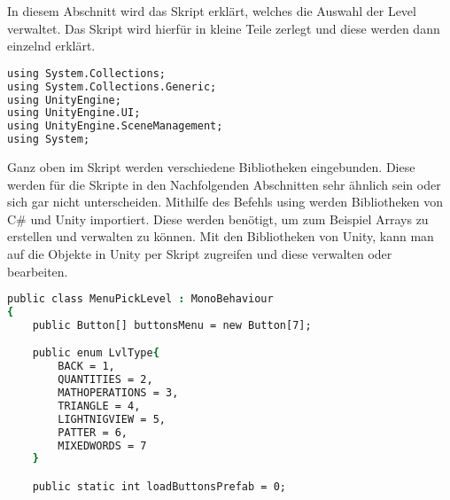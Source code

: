 In diesem Abschnitt wird das Skript erklärt, welches die Auswahl der Level verwaltet.
Das Skript wird hierfür in kleine Teile zerlegt und diese werden dann einzelnd erklärt.\\

\begin{lstlisting}[language=csh, caption={MenuPickLevel.cs Klasse Menü Imports}]
using System.Collections;
using System.Collections.Generic;
using UnityEngine;
using UnityEngine.UI;
using UnityEngine.SceneManagement;
using System;
\end{lstlisting}

Ganz oben im Skript werden verschiedene Bibliotheken eingebunden. Diese werden für die Skripte in den Nachfolgenden Abschnitten sehr ähnlich sein oder sich gar nicht unterscheiden. Mithilfe des Befehls using werden Bibliotheken von C# und Unity importiert. Diese werden benötigt, um zum Beispiel Arrays zu erstellen und verwalten zu können. Mit den Bibliotheken von Unity, kann man auf die Objekte in Unity per Skript zugreifen und diese verwalten oder bearbeiten.\\

\begin{lstlisting}[language=csh, caption={MenuPickLevel.cs Klasse Menü Variablen}]
public class MenuPickLevel : MonoBehaviour
{
	public Button[] buttonsMenu = new Button[7];

	public enum LvlType{
		BACK = 1,
		QUANTITIES = 2,
		MATHOPERATIONS = 3,
		TRIANGLE = 4,
		LIGHTNIGVIEW = 5,
		PATTER = 6,
		MIXEDWORDS = 7
	}

	public static int loadButtonsPrefab = 0;
\end{lstlisting}

